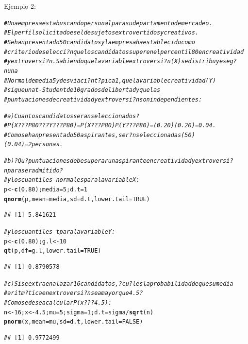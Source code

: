 \documentclass[10pt,a4paper]{article}\usepackage[]{graphicx}\usepackage[]{color}
\makeatletter
\newcommand{\hlnum}[1]{\textcolor[rgb]{0.686,0.059,0.569}{#1}}%
\newcommand{\hlcom}[1]{\textcolor[rgb]{0.678,0.584,0.686}{\textit{#1}}}%
\newcommand{\hlopt}[1]{\textcolor[rgb]{0,0,0}{#1}}%
\newcommand{\hlstd}[1]{\textcolor[rgb]{0.345,0.345,0.345}{#1}}%
\newcommand{\hlkwb}[1]{\textcolor[rgb]{0.69,0.353,0.396}{#1}}%
\newcommand{\hlkwc}[1]{\textcolor[rgb]{0.333,0.667,0.333}{#1}}%
\newcommand{\hlkwd}[1]{\textcolor[rgb]{0.737,0.353,0.396}{\textbf{#1}}}%
\newenvironment{kframe}{%
 \def\at@end@of@kframe{}%
 \ifinner\ifhmode%
  \def\at@end@of@kframe{\end{minipage}}%
  \begin{minipage}{\columnwidth}%
 \fi\fi%
 \def\FrameCommand##1{\hskip\@totalleftmargin \hskip-\fboxsep
 \colorbox{shadecolor}{##1}\hskip-\fboxsep
     \hskip-\linewidth \hskip-\@totalleftmargin \hskip\columnwidth}%
 \MakeFramed {\advance\hsize-\width
   \@totalleftmargin\z@ \linewidth\hsize
   \@setminipage}}%
 {\par\unskip\endMakeFramed%
 \at@end@of@kframe}
\newenvironment{knitrout}{}{} %
\makeatother
\begin{document}
Ejemplo 2: 
\begin{knitrout}
\color{fgcolor}\begin{kframe}
\begin{alltt}
\hlcom{#Una empresa esta buscando personal para su departamento de mercadeo. }
\hlcom{#El perfil solicitado es el de sujetos extrovertidos y creativos. }
\hlcom{#Se han presentado 50 candidatos y la empresa ha establecido como }
\hlcom{#criterio de selecci?n que los candidatos superen el percentil 80 en creatividad }
\hlcom{#y extroversi?n. Sabiendo que la variable extroversi?n (X) se distribuye seg?n una }
\hlcom{#Normal de media 5 y desviaci?n t?pica 1, que la variable creatividad (Y) }
\hlcom{#sigue una t-Student de 10 grados de libertad y que las }
\hlcom{#puntuaciones de creatividad y extroversi?n son independientes: }

\hlcom{#a) Cuantos candidatos seran seleccionados? }
\hlcom{#P(X ??? P80 ??? Y ??? P80) = P(X ??? P80) P(Y ??? P80)= (0.20)(0.20)=0.04. }
\hlcom{#Como se han presentado 50 aspirantes, ser?n seleccionadas (50) (0.04)= 2 personas. }

\hlcom{#b) ?Qu? puntuaciones debe superar un aspirante en creatividad y extroversi?n para ser admitido?}
\hlcom{#y los cuantiles-normales para la variable X: }
\hlstd{p} \hlkwb{<-} \hlkwd{c}\hlstd{(}\hlnum{0.80}\hlstd{); media}\hlkwb{=}\hlnum{5}\hlstd{; d.t}\hlkwb{=}\hlnum{1}
\hlkwd{qnorm}\hlstd{(p,} \hlkwc{mean}\hlstd{=media,} \hlkwc{sd}\hlstd{=d.t,} \hlkwc{lower.tail}\hlstd{=}\hlnum{TRUE}\hlstd{)}
\end{alltt}
\begin{verbatim}
## [1] 5.841621
\end{verbatim}
\begin{alltt}
\hlcom{#y los cuantiles-t para la variable Y: }
\hlstd{p} \hlkwb{<-} \hlkwd{c}\hlstd{(}\hlnum{0.80}\hlstd{); g.l} \hlkwb{<-} \hlnum{10}
\hlkwd{qt}\hlstd{(p,} \hlkwc{df}\hlstd{=g.l,} \hlkwc{lower.tail}\hlstd{=}\hlnum{TRUE}\hlstd{)}
\end{alltt}
\begin{verbatim}
## [1] 0.8790578
\end{verbatim}
\begin{alltt}
\hlcom{#c) Si se extraen al azar 16 candidatos, ?cu?l es la probabilidad de que su media }
\hlcom{#aritm?tica en extroversi?n sea mayor que 4.5? }
\hlcom{#Como se desea calcular P(x???4.5): }
\hlstd{n} \hlkwb{<-} \hlnum{16}\hlstd{; x} \hlkwb{<-} \hlnum{4.5}\hlstd{; mu}\hlkwb{=}\hlnum{5}\hlstd{; sigma}\hlkwb{=}\hlnum{1}\hlstd{; d.t}\hlkwb{=}\hlstd{sigma}\hlopt{/}\hlkwd{sqrt}\hlstd{(n)}
\hlkwd{pnorm}\hlstd{(x,} \hlkwc{mean}\hlstd{=mu,} \hlkwc{sd}\hlstd{=d.t,} \hlkwc{lower.tail}\hlstd{=}\hlnum{FALSE}\hlstd{)}
\end{alltt}
\begin{verbatim}
## [1] 0.9772499
\end{verbatim}
\end{kframe}
\end{knitrout}
\end{document}

